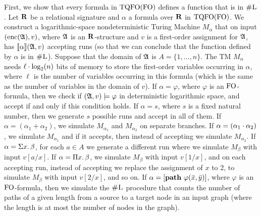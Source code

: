 
First, we show that every formula in ${\rm TQFO}({\rm FO})$ defines a function that is in $\text{\sc \#L}$.
Let $\mathbf{R}$ be a relational signature and $\alpha$ a formula over $\mathbf{R}$ in ${\rm TQFO}({\rm FO})$. We construct a logarithmic-space nondeterministic Turing Machine $M_{\alpha}$ that on input $({\rm enc}(\mathfrak{A}),v)$, where $\mathfrak{A}$ is an $\mathbf{R}$-structure and $v$ is a first-order assignment for $\mathfrak{A}$, has ${\llbracket{}{\alpha}\rrbracket}(\mathfrak{A},v)$ accepting runs (so that we can conclude that the function defined by $\alpha$ is in $\text{\sc \#L}$). Suppose that the domain of $\mathfrak{A}$ is $A = \{1,\ldots,n\}$. The TM $M_{\alpha}$ needs $\ell \cdot\log_2(n)$ bits of memory to store the first-order variables occurring in $\alpha$, where $\ell$ is the number of variables occurring in this formula (which is the same as the number of variables in the domain of $v$). If $\alpha = \varphi$, where $\varphi$ is an ${\rm FO}$-formula, then we check if $(\mathfrak{A},v)\models\varphi$ in deterministic logarithmic space, and accept if and only if this condition holds. If $\alpha = s$, where $s$ is a fixed natural number, then we generate $s$ possible runs and accept in all of them. If $\alpha = (\alpha_1 + \alpha_2)$, we simulate $M_{\alpha_1}$ and $M_{\alpha_2}$ on separate branches. If $\alpha = (\alpha_1\cdot\alpha_2)$, we simulate $M_{\alpha_1}$ and if it accepts, then instead of accepting we simulate $M_{\alpha_2}$. If $\alpha = \Sigma{x}.\,\beta$, for each $a\in A$ we generate a different run where we simulate $M_{\beta}$ with input $v[a/x]$. If $\alpha = \Pi{x}.\,\beta$, we simulate $M_{\beta}$ with input $v[1/x]$, and on each accepting run, instead of accepting we replace the assignment of $x$ to 2, to simulate $M_{\beta}$ with input $v[2/x]$, and so on. If $\alpha = [{\bf path} \,\, \varphi(\bar{x},\bar{y})]$, where $\varphi$ is an ${\rm FO}$-formula, then we simulate the $\text{\sc \#L}$ procedure that counts the number of paths of a given length from a source to a target node in an input graph (where the length is at most the number of nodes in the graph).

